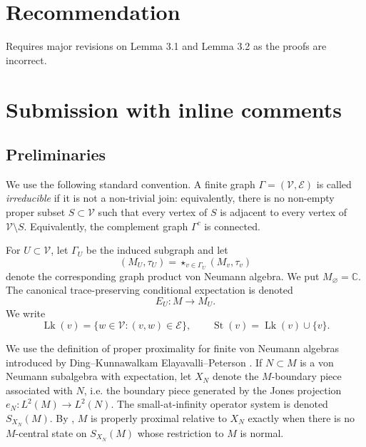 \documentclass[12pt]{article}
\theoremstyle{definition}
\newcommand{\V}{\mathcal V}
\newcommand{\E}{\mathcal E}
\newcommand{\Lk}{\operatorname{Lk}}
\newcommand{\St}{\operatorname{St}}
\newcommand{\C}{\mathbb C}
\begin{document}
\section{Recommendation}

  Requires major revisions on Lemma 3.1 and Lemma 3.2 as the proofs are incorrect.

  \section{Submission with inline comments}


\date{}




\begin{abstract}
We prove that if $\Gamma$ is a finite join-irreducible simplicial graph with at least three vertices and if each tracial vertex algebra $(M_v,\tau_v)$ contains a trace-zero unitary, then the tracial graph product von Neumann algebra is properly proximal.
\end{abstract}

\subsection{Preliminaries}

We use the following standard convention.  A finite graph $\Gamma=(\V,\E)$ is called \emph{irreducible} if it is not a non-trivial join: equivalently, there is no non-empty proper subset $S\subset \V$ such that every vertex of $S$ is adjacent to every vertex of $\V\setminus S$.  Equivalently, the complement graph $\Gamma^c$ is connected.

For $U\subset \V$, let $\Gamma_U$ be the induced subgraph and let
\[
(M_U,\tau_U)=\mathop{\star}_{v\in \Gamma_U}(M_v,\tau_v)
\]
denote the corresponding graph product von Neumann algebra.  We put $M_\varnothing=\C$.  The canonical trace-preserving conditional expectation is denoted
\[
E_U:M\to M_U.
\]
We write
\[
\Lk(v)=\{w\in \V: (v,w)\in \E\},
\qquad
\St(v)=\Lk(v)\cup\{v\}.
\]

We use the definition of proper proximality for finite von Neumann algebras introduced by Ding--Kunnawalkam Elayavalli--Peterson \cite{DKEP}.  If $N\subset M$ is a von Neumann subalgebra with expectation, let $X_N$ denote the $M$-boundary piece associated with $N$, i.e. the boundary piece generated by the Jones projection $e_N:L^2(M)\to L^2(N)$.  The small-at-infinity operator system is denoted $S_{X_N}(M)$.  By \cite[Theorems 6.2 and 8.5]{DKEP}, $M$ is properly proximal relative to $X_N$ exactly when there is no $M$-central state on $S_{X_N}(M)$ whose restriction to $M$ is normal.
\end{document}
